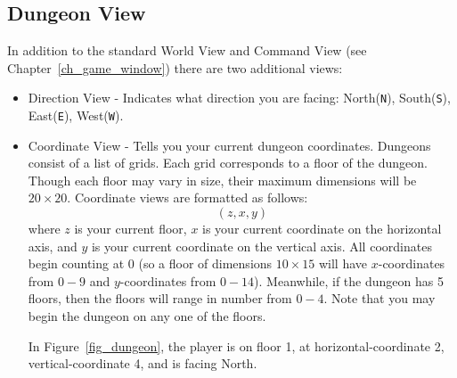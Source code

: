 \documentclass{report}
\begin{document}
\begin{itemize}
\begin{itemize}
\section{Dungeon View}
In addition to the standard World View and Command View (see 
Chapter~\ref{ch_game_window}) there are two additional views:
\begin{itemize}
    \item Direction View - Indicates what direction you are facing: 
    North(\verb|N|), South(\verb|S|), East(\verb|E|), West(\verb|W|).
    \item Coordinate View - Tells you your current dungeon coordinates. Dungeons
    consist of a list of grids. Each grid corresponds to a floor of the dungeon. 
    Though each floor may vary in size, their maximum dimensions will be 
    $20\times 20$.
    Coordinate views are formatted as follows:
    $$(z,x,y)$$
    where $z$ is your current floor, $x$ is your current coordinate on the 
    horizontal axis, and $y$ is your current coordinate on the vertical axis. 
    All coordinates begin counting at $0$ (so a floor of dimensions
    $10\times 15$ will have $x$-coordinates from $0-9$ and $y$-coordinates from
    $0-14$). Meanwhile,
    if the dungeon has 5 floors, then the floors will range in number from
    $0-4$. Note that you may begin the dungeon on any one of the floors.

    In Figure~\ref{fig_dungeon}, the player is on floor 1, at horizontal-coordinate
    2, vertical-coordinate 4, and is facing North.
\end{itemize}


\end{itemize}
\end{itemize}
\end{document}
